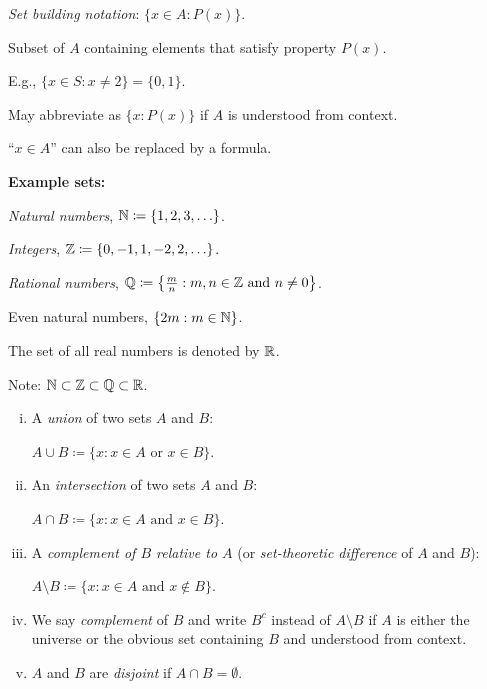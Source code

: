 \documentclass[10pt,aspectratio=169]{beamer}
\begin{document}
\begin{frame}
\emph{Set building notation}:
\quad $\bigl\{ x \in A : P(x) \bigr\}$.

\pause
\medskip

Subset of $A$ containing elements that satisfy property $P(x)$.

\medskip
\pause

E.g., $\{ x \in S : x \not= 2 \} = \{ 0, 1 \}$.

\medskip
\pause

May abbreviate as $\bigl\{ x : P(x) \bigr\}$ if $A$ is understood
from context.

\medskip
\pause

``$x \in A$'' can also be replaced by a formula.

\medskip
\pause

\textbf{Example sets:}

\medskip
\pause

\emph{Natural numbers}, ${\mathbb{N}} \coloneqq \{ 1, 2, 3, \ldots \}$.

\medskip
\pause

\emph{Integers}, ${\mathbb{Z}} \coloneqq \{ 0, -1, 1, -2, 2, \ldots \}$.

\medskip
\pause

\emph{Rational numbers}, ${\mathbb{Q}} \coloneqq \bigl\{ \frac{m}{n} :  m, n \in {\mathbb{Z}} \text{ and } n \not= 0 \bigr\}$.

\medskip
\pause

Even natural numbers, $\{  2m : m \in {\mathbb{N}} \}$.

\medskip
\pause

The set of all real numbers is denoted by ${\mathbb{R}}$.

\medskip
\pause

Note: ${\mathbb{N}} \subset {\mathbb{Z}} \subset {\mathbb{Q}} \subset {\mathbb{R}}$.

\end{frame}

\begin{frame}
\begin{definition}
\begin{enumerate}[(i)]
\item
A \emph{union} of two sets $A$ and $B$:

$A \cup B \coloneqq \{ x : x \in A \text{ or } x \in B \}$.
\item
\pause
An \emph{intersection} of two sets $A$ and $B$:

$A \cap B \coloneqq \{ x : x \in A \text{ and } x \in B \}$.
\item
\pause
A \emph{complement of $B$ relative to $A$}
(or \emph{set-theoretic difference} of $A$ and $B$):

$A \setminus B \coloneqq \{ x : x \in A \text{ and } x \notin B \}$.
\item
\pause
We say
\emph{complement} of $B$ and write $B^c$
instead of $A \setminus B$ if
$A$ is either the universe or the obvious
set containing $B$ and understood from context.
\item
\pause
$A$ and $B$ are \emph{disjoint} if $A \cap B = \emptyset$.
\end{enumerate}
\end{definition}
\end{frame}
\end{document}

